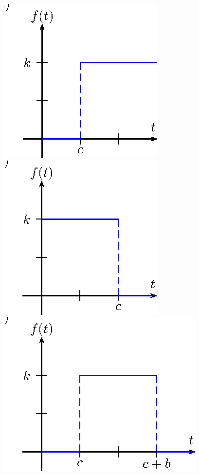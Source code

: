 \begin{exer}{\label{ex_cap_3_1}}
\begin{center}
\includegraphics{cap_definicao/pics/figura_4}
\includegraphics{cap_definicao/pics/figura_5}
\includegraphics{cap_definicao/pics/figura_6}

\end{center}
\end{exer}

